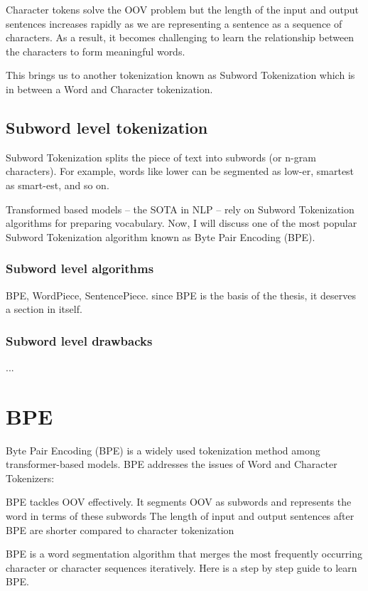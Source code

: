Character tokens solve the OOV problem but the length of the input and output sentences increases rapidly as we are representing a sentence as a sequence of characters. As a result, it becomes challenging to learn the relationship between the characters to form meaningful words.

This brings us to another tokenization known as Subword Tokenization which is in between a Word and Character tokenization.

\subsection{Subword level tokenization}

Subword Tokenization splits the piece of text into subwords (or n-gram characters). For example, words like lower can be segmented as low-er, smartest as smart-est, and so on.

Transformed based models – the SOTA in NLP – rely on Subword Tokenization algorithms for preparing vocabulary. Now, I will discuss one of the most popular Subword Tokenization algorithm known as Byte Pair Encoding (BPE).

\subsubsection{Subword level algorithms}

BPE, WordPiece, SentencePiece. since BPE is the basis of the thesis, it deserves a section in itself.

\subsubsection{Subword level drawbacks}

...

\section{BPE}

Byte Pair Encoding (BPE) is a widely used tokenization method among transformer-based models. BPE addresses the issues of Word and Character Tokenizers:

    BPE tackles OOV effectively. It segments OOV as subwords and represents the word in terms of these subwords
    The length of input and output sentences after BPE are shorter compared to character tokenization

BPE is a word segmentation algorithm that merges the most frequently occurring character or character sequences iteratively. Here is a step by step guide to learn BPE.

